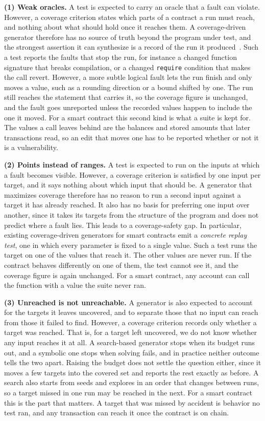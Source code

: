 \documentclass[manuscript,anonymous]{acmart}
\begin{document}
\textbf{(1) Weak oracles.} A test is expected to carry an oracle that a fault
can violate. However, a coverage criterion states which parts of a contract a
run must reach, and nothing about what should hold once it reaches them. A
coverage-driven generator therefore has no source of truth beyond the program
under test, and the strongest assertion it can synthesize is a record of the run
it produced~\cite{Barr2015,syntest_solidity}. Such a test reports the faults
that stop the run, for instance a changed function signature that breaks
compilation, or a changed \texttt{require} condition that makes the call revert.
However, a more subtle logical fault lets the run finish and only moves a value,
such as a rounding direction or a bound shifted by one. The run still reaches
the statement that carries it, so the coverage figure is unchanged, and the
fault goes unreported unless the recorded values happen to include the one it
moved. For a smart contract this second kind is what a suite is kept for. The
values a call leaves behind are the balances and stored amounts that later
transactions read, so an edit that moves one has to be reported whether or not
it is a vulnerability.

\textbf{(2) Points instead of ranges.} A test is expected to run on the inputs
at which a fault becomes visible. However, a coverage criterion is satisfied by
one input per target, and it says nothing about which input that should be. A
generator that maximizes coverage therefore has no reason to run a second input
against a target it has already reached. It also has no basis for preferring one
input over another, since it takes its targets from the structure of the program
and does not predict where a fault lies. This leads to a coverage-safety gap. In
particular, existing coverage-driven generators for smart contracts emit a
\emph{concrete replay test}, one in which every parameter is fixed to a single
value. Such a test runs the target on one of the values that reach it. The other
values are never run. If the contract behaves differently on one of them, the
test cannot see it, and the coverage figure is again unchanged. For a smart
contract, any account can call the function with a value the suite never ran.

\textbf{(3) Unreached is not unreachable.} A generator is also expected to
account for the targets it leaves uncovered, and to separate those that no input
can reach from those it failed to find. However, a coverage criterion records
only whether a target was reached. That is, for a target left uncovered, we do
not know whether any input reaches it at all. A search-based generator stops when
its budget runs out, and a symbolic one stops when solving fails, and in practice
neither outcome tells the two apart. Raising the budget does not settle the
question either, since it moves a few targets into the covered set and reports
the rest exactly as before. A search also starts from seeds and explores in an
order that changes between runs, so a target missed in one run may be reached in
the next. For a smart contract this is the part that matters. A target that was
missed by accident is behavior no test ran, and any transaction can reach it once
the contract is on chain.
\end{document}
